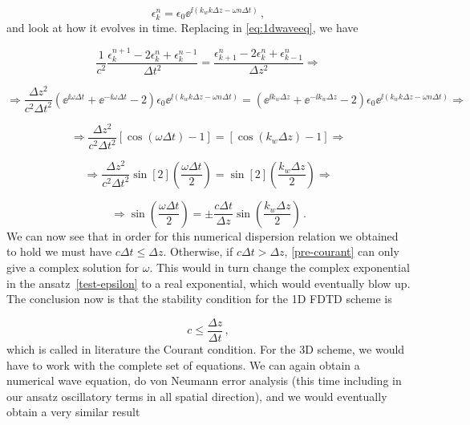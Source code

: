 \documentclass[12pt, class=report, crop=false]{standalone}
\begin{document}
\begin{equation}
  \label{test-epsilon}
  \epsilon^n_k = \epsilon_0 \ee^{\ii (k_w k\Delta z- \omega n\Delta t)}\,,
\end{equation}
and look at how it evolves in time. Replacing in \cref{eq:1dwaveeq}, we have

\begin{equation*}
  \frac{1}{c^2} \frac{\epsilon^{n+1}_k - 2\epsilon^n_k + \epsilon^{n-1}_k}{\Delta t^2} = \frac{\epsilon^n_{k+1} - 2\epsilon^n_k + \epsilon^n_{k-1}}{\Delta z^2} \Rightarrow
\end{equation*}

\begin{equation*}
  \Rightarrow
  \frac{\Delta z^2}{c^2 \Delta t^2} \left(\ee^{\ii\omega\Delta t} + \ee^{-\ii\omega\Delta t} - 2 \right) \epsilon_0 \ee^{\ii (k_w k\Delta z- \omega n\Delta t)} = \left(\ee^{\ii k_w \Delta z} + \ee^{-\ii k_w \Delta z} - 2 \right) \epsilon_0 \ee^{\ii (k_w k\Delta z- \omega n\Delta t)} \Rightarrow
\end{equation*}

\begin{equation*}
  \Rightarrow \frac{\Delta z^2}{c^2 \Delta t^2} \left[\cos(\omega\Delta t) -1\right] = \left[\cos(k_w \Delta z) -1\right] \Rightarrow
\end{equation*}

\begin{equation*}
  \Rightarrow \frac{\Delta z^2}{c^2 \Delta t^2} \sin[2](\frac{\omega\Delta t}{2}) = \sin[2](\frac{k_w\Delta z}{2}) \Rightarrow
\end{equation*}

\begin{equation}
  \label{pre-courant}
  \Rightarrow \sin(\frac{\omega\Delta t}{2}) = \pm \frac{c\Delta t}{\Delta z} \sin(\frac{k_w\Delta z}{2})\,.
\end{equation}
We can now see that in order for this numerical dispersion relation we obtained to hold we must have \(c\Delta t \leq \Delta z\). Otherwise, if \(c\Delta t>\Delta z\), \cref{pre-courant} can only give a complex solution for \(\omega\). This would in turn change the complex exponential in the ansatz~\ref{test-epsilon} to a real exponential, which would eventually blow up. The conclusion now is that the stability condition for the 1D FDTD scheme is

\begin{equation}
  c \leq \frac{\Delta z}{\Delta t}\,,
\end{equation}
which is called in literature the Courant condition. For the 3D scheme, we would have to work with the complete set of equations. We can again obtain a numerical wave equation, do von Neumann error analysis (this time including in our ansatz oscillatory terms in all spatial direction), and we would eventually obtain a very similar result
\end{document}
